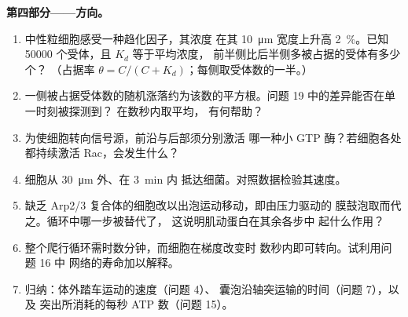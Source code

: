 \begin{problem}
\medskip
\noindent\textbf{第四部分——方向。}
\begin{enumerate}[resume]
  \item 中性粒细胞感受一种趋化因子，其浓度
        在其 \qty{10}{\micro m} 宽度上升高 \qty{2}{\%}。已知
        \num{50000} 个受体，且 $K_{d}$ 等于平均浓度，
        前半侧比后半侧多被占据的受体有多少个？
        （占据率 $\theta = C/(C +
        K_{d})$；每侧取受体数的一半。）
  \item 一侧被占据受体数的随机涨落约为该数的平方根。问题 19
        中的差异能否在单一时刻被探测到？
        在数秒内取平均，
        有何帮助？
  \item 为使细胞转向信号源，前沿与后部须分别激活
        哪一种小 GTP 酶？若细胞各处都持续激活
        Rac，会发生什么？
  \item 细胞从 \qty{30}{\micro m} 外、在 \qty{3}{min} 内
        抵达细菌。对照数据检验其速度。
  \item 缺乏 Arp2/3 复合体的细胞改以出泡运动移动，即由压力驱动的
        膜鼓泡取而代之。循环中哪一步被替代了，
        这说明肌动蛋白在其余各步中
        起什么作用？
  \item 整个爬行循环需时数分钟，而细胞在梯度改变时
        数秒内即可转向。试利用问题 16 中
        网络的寿命加以解释。
  \item 归纳：体外踏车运动的速度（问题 4）、
        囊泡沿轴突运输的时间（问题 7），以及
        突出所消耗的每秒 ATP 数（问题 15）。
\end{enumerate}
\end{problem}
